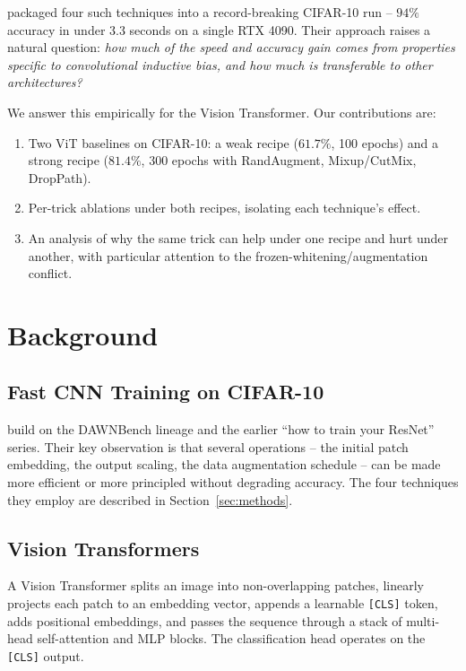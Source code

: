 \documentclass[10pt,twocolumn]{article}
\begin{document}
\citet{garg2024cifar10} packaged four such techniques into a record-breaking CIFAR-10 run -- $94\%$ accuracy in under 3.3 seconds on a single RTX 4090. Their approach raises a natural question: \emph{how much of the speed and accuracy gain comes from properties specific to convolutional inductive bias, and how much is transferable to other architectures?}

We answer this empirically for the Vision Transformer. Our contributions are:
\begin{enumerate}[leftmargin=*, itemsep=0pt]
    \item Two ViT baselines on CIFAR-10: a weak recipe ($61.7\%$, 100 epochs) and a strong recipe ($81.4\%$, 300 epochs with RandAugment, Mixup/CutMix, DropPath).
    \item Per-trick ablations under both recipes, isolating each technique's effect.
    \item An analysis of why the same trick can help under one recipe and hurt under another, with particular attention to the frozen-whitening/augmentation conflict.
\end{enumerate}

\section{Background}\label{sec:background}

\subsection{Fast CNN Training on CIFAR-10}
\citet{garg2024cifar10} build on the DAWNBench lineage \citep{coleman2017dawnbench} and the earlier ``how to train your ResNet'' series. Their key observation is that several operations -- the initial patch embedding, the output scaling, the data augmentation schedule -- can be made more efficient or more principled without degrading accuracy. The four techniques they employ are described in Section~\ref{sec:methods}.

\subsection{Vision Transformers}
A Vision Transformer \citep{dosovitskiy2021vit} splits an image into non-overlapping patches, linearly projects each patch to an embedding vector, appends a learnable \texttt{[CLS]} token, adds positional embeddings, and passes the sequence through a stack of multi-head self-attention and MLP blocks. The classification head operates on the \texttt{[CLS]} output.
\end{document}
